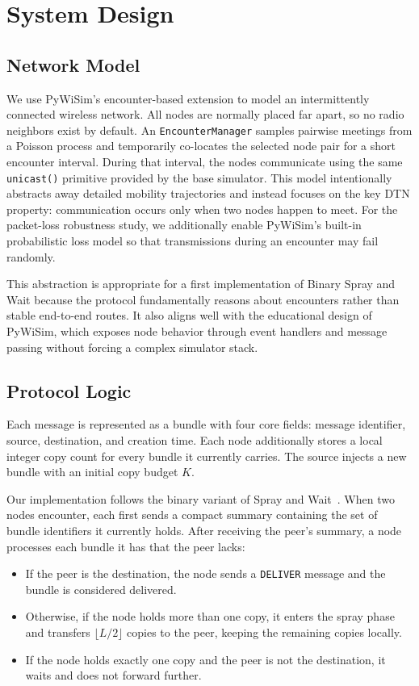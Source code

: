 \section{System Design}

\subsection{Network Model}

We use PyWiSim's encounter-based extension to model an intermittently connected wireless network. All nodes are normally placed far apart, so no radio neighbors exist by default. An \texttt{EncounterManager} samples pairwise meetings from a Poisson process and temporarily co-locates the selected node pair for a short encounter interval. During that interval, the nodes communicate using the same \texttt{unicast()} primitive provided by the base simulator. This model intentionally abstracts away detailed mobility trajectories and instead focuses on the key DTN property: communication occurs only when two nodes happen to meet. For the packet-loss robustness study, we additionally enable PyWiSim's built-in probabilistic loss model so that transmissions during an encounter may fail randomly.

This abstraction is appropriate for a first implementation of Binary Spray and Wait because the protocol fundamentally reasons about encounters rather than stable end-to-end routes. It also aligns well with the educational design of PyWiSim, which exposes node behavior through event handlers and message passing without forcing a complex simulator stack.

\subsection{Protocol Logic}

Each message is represented as a bundle with four core fields: message identifier, source, destination, and creation time. Each node additionally stores a local integer copy count for every bundle it currently carries. The source injects a new bundle with an initial copy budget $K$.

Our implementation follows the binary variant of Spray and Wait~\cite{spyropoulos2005spraywait}. When two nodes encounter, each first sends a compact summary containing the set of bundle identifiers it currently holds. After receiving the peer's summary, a node processes each bundle it has that the peer lacks:
\begin{itemize}
    \item If the peer is the destination, the node sends a \texttt{DELIVER} message and the bundle is considered delivered.
    \item Otherwise, if the node holds more than one copy, it enters the spray phase and transfers $\lfloor L/2 \rfloor$ copies to the peer, keeping the remaining copies locally.
    \item If the node holds exactly one copy and the peer is not the destination, it waits and does not forward further.
\end{itemize}

